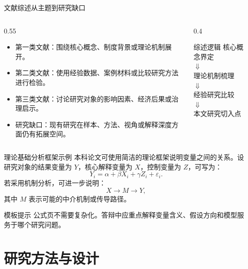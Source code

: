 \documentclass[aspectratio=169,11pt]{beamer}
\begin{document}
\begin{frame}{文献综述}{从主题到研究缺口}
  \begin{columns}[T,onlytextwidth]
    \begin{column}{0.55\textwidth}
      \begin{itemize}
        \item 第一类文献：围绕核心概念、制度背景或理论机制展开。
        \item 第二类文献：使用经验数据、案例材料或比较研究方法进行检验。
        \item 第三类文献：讨论研究对象的影响因素、经济后果或治理启示。
        \item 研究缺口：现有研究在样本、方法、视角或解释深度方面仍有拓展空间。
      \end{itemize}
    \end{column}
    \begin{column}{0.4\textwidth}
      \begin{block}{综述逻辑}
        核心概念界定\\
        $\Downarrow$\\
        理论机制梳理\\
        $\Downarrow$\\
        经验研究比较\\
        $\Downarrow$\\
        本文研究切入点
      \end{block}
    \end{column}
  \end{columns}
\end{frame}

\begin{frame}{理论基础}{分析框架示例}
  本科论文可使用简洁的理论框架说明变量之间的关系。设研究对象的结果变量为 $Y$，核心解释变量为 $X$，控制变量为 $Z$，可写为：
  \[
    Y_i = \alpha + \beta X_i + \gamma Z_i + \varepsilon_i.
  \]
  若采用机制分析，可进一步说明：
  \[
    X \rightarrow M \rightarrow Y,
  \]
  其中 $M$ 表示可能的中介机制或传导路径。
  \begin{block}{模板提示}
    公式页不需要复杂化。答辩中应重点解释变量含义、假设方向和模型服务于哪个研究问题。
  \end{block}
\end{frame}

\section{研究方法与设计}
\end{document}
